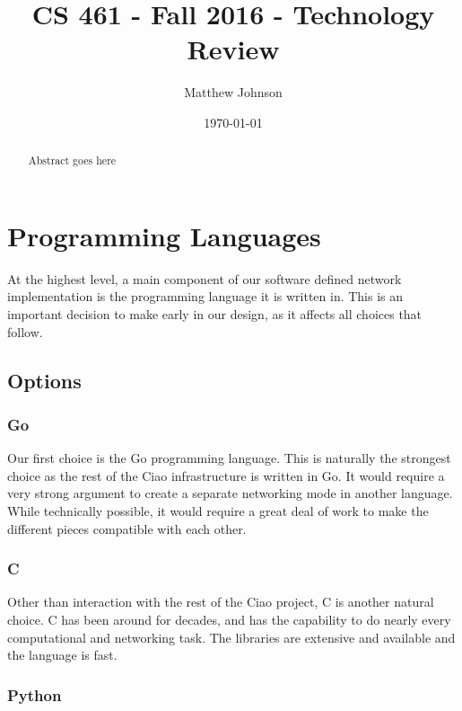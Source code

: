 \documentclass[10pt,letterpaper,onecolumn,draftclsnofoot]{IEEEtran}
\begin{document}
\begin{titlepage}
	\title{CS 461 - Fall 2016 - Technology Review}
	\author{Matthew Johnson}
	\date{\today}
	\maketitle
	\vspace{4cm}
	\begin{abstract}
		\noindent Abstract goes here
	\end{abstract}

\end{titlepage}
\tableofcontents
\clearpage

\section{Programming Languages}

At the highest level, a main component of our software defined network
implementation is the programming language it is written in. This is an
important decision to make early in our design, as it affects all choices that
follow.

\subsection{Options}

\subsubsection{Go}

Our first choice is the Go programming language. This is naturally the strongest
choice as the rest of the Ciao infrastructure is written in Go. It would require
a very strong argument to create a separate networking mode in another language.
While technically possible, it would require a great deal of work to make the
different pieces compatible with each other.

\subsubsection{C}

Other than interaction with the rest of the Ciao project, C is another natural
choice. C has been around for decades, and has the capability to do nearly every
computational and networking task. The libraries are extensive and available and
the language is fast.

\subsubsection{Python}
\end{document}
